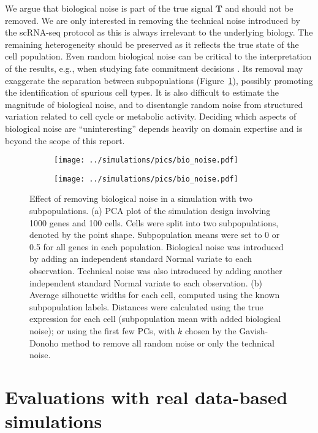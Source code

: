 \documentclass[10pt,letterpaper]{article}
\begin{document}
We argue that biological noise is part of the true signal $\mathbf{T}$ and should not be removed.
We are only interested in removing the technical noise introduced by the scRNA-seq protocol as this is always irrelevant to the underlying biology.
The remaining heterogeneity should be preserved as it reflects the true state of the cell population.
Even random biological noise can be critical to the interpretation of the results, e.g., when studying fate commitment decisions \cite{balazsi2011cellular}.
Its removal may exaggerate the separation between subpopulations (Figure~\ref{fig:bionoise}), possibly promoting the identification of spurious cell types.
It is also difficult to estimate the magnitude of biological noise, and to disentangle random noise from structured variation related to cell cycle or metabolic activity.
Deciding which aspects of biological noise are ``uninteresting'' depends heavily on domain expertise and is beyond the scope of this report.

\begin{figure}[btp]
\centering
\begin{subfigure}[b]{0.49\textwidth}
\texttt{[image: ../simulations/pics/bio\_noise.pdf]}
\caption{}
\end{subfigure}
\begin{subfigure}[b]{0.49\textwidth}
\texttt{[image: ../simulations/pics/bio\_noise.pdf]}
\caption{}
\end{subfigure}
\caption{Effect of removing biological noise in a simulation with two subpopulations.
(a) PCA plot of the simulation design involving 1000 genes and 100 cells.
Cells were split into two subpopulations, denoted by the point shape.
Subpopulation means were set to 0 or 0.5 for all genes in each population.
Biological noise was introduced by adding an independent standard Normal variate to each observation.
Technical noise was also introduced by adding another independent standard Normal variate to each observation.
(b) Average silhouette widths for each cell, computed using the known subpopulation labels.
Distances were calculated using the true expression for each cell (subpopulation mean with added biological noise);
or using the first few PCs, with $k$ chosen by the Gavish-Donoho method to remove all random noise or only the technical noise.
}
\label{fig:bionoise}
\end{figure}

\section{Evaluations with real data-based simulations}
\end{document}
